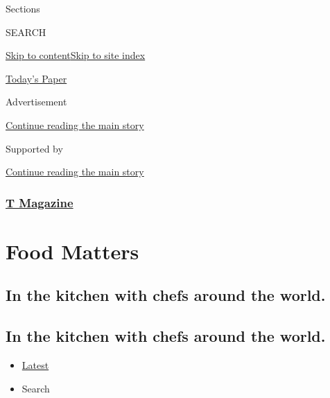 Sections

SEARCH

\protect\hyperlink{site-content}{Skip to
content}\protect\hyperlink{site-index}{Skip to site index}

\href{https://myaccount.nytimes3xbfgragh.onion/auth/login?response_type=cookie\&client_id=vi}{}

\href{https://www.nytimes3xbfgragh.onion/section/todayspaper}{Today's
Paper}

Advertisement

\protect\hyperlink{after-top}{Continue reading the main story}

Supported by

\protect\hyperlink{after-sponsor}{Continue reading the main story}

\hypertarget{t-magazine}{%
\subsubsection{\texorpdfstring{\href{/section/t-magazine}{T
Magazine}}{T Magazine}}\label{t-magazine}}

\hypertarget{food-matters}{%
\section{Food Matters}\label{food-matters}}

\hypertarget{in-the-kitchen-with-chefs-around-the-world}{%
\subsection{In the kitchen with chefs around the
world.}\label{in-the-kitchen-with-chefs-around-the-world}}

\hypertarget{in-the-kitchen-with-chefs-around-the-world-1}{%
\subsection{In the kitchen with chefs around the
world.}\label{in-the-kitchen-with-chefs-around-the-world-1}}

\begin{itemize}
\tightlist
\item
  \protect\hyperlink{stream-panel}{Latest}
\item
  Search
\end{itemize}

